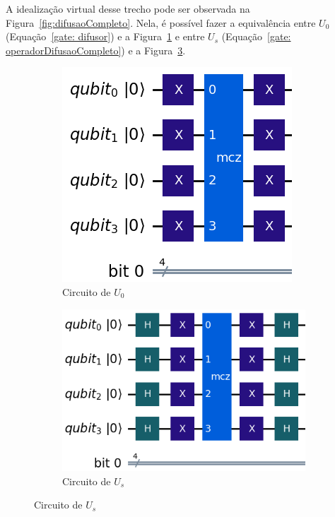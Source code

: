 A idealização virtual desse trecho pode ser observada na Figura~\ref{fig:difusaoCompleto}. Nela, é possível fazer a equivalência entre $U_0$ (Equação~\ref{gate: difusor}) e a Figura~\ref{subfig:Uo} e entre $U_s$ (Equação~\ref{gate: operadorDifusaoCompleto}) e a Figura~\ref{subfig:Us}.
%
\begin{figure}[ht!]
    \centering
    \captionsetup{justification=centering}
    \caption{Circuito Qu\^{a}ntico Virtual - Amplificação, $U_0$ e $U_s$.}
    \label{fig:difusaoCompleto}

    \begin{subfigure}[b]{0.25\textwidth}
        \centering
        \includegraphics[width=\linewidth]{Imagens/circuitoDifusor.png}
        \caption{Circuito de $U_0$}
        \label{subfig:Uo}
    \end{subfigure}
    \hspace{1cm}
    \begin{subfigure}[b]{0.35\textwidth}
        \centering
        \includegraphics[width=\linewidth]{Imagens/circuitoDifusorCompleto.png}
        \caption{Circuito de $U_s$}
        \label{subfig:Us}
    \end{subfigure}
    

\end{figure}
